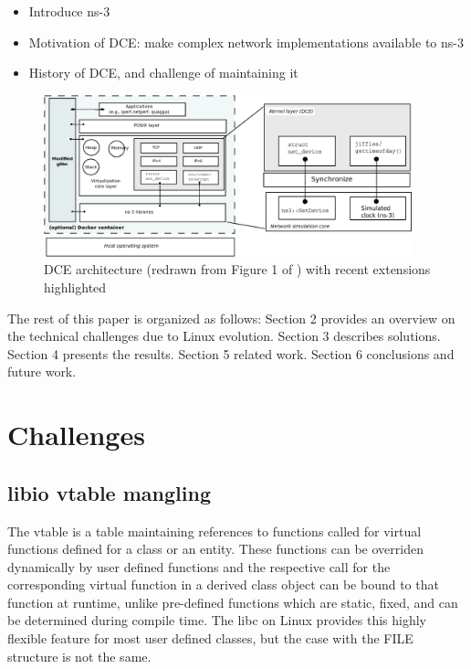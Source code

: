 \documentclass{sig-alternate}
\begin{document}
\begin{itemize}
\item Introduce ns-3
\item Motivation of DCE: make complex network implementations available to ns-3
\item History of DCE, and challenge of maintaining it
\end{itemize}

\begin{figure}[h!]
  \centering
    \includegraphics[width=0.95\textwidth]{figs/architecture.png}

  \caption{DCE architecture (redrawn from Figure 1 of \cite{Tazaki13}) with recent extensions highlighted}
  \label{fig:architecture}
\end{figure}

The rest of this paper is organized as follows: Section 2 provides an overview on the technical challenges due to Linux evolution.
Section 3 describes solutions.
Section 4 presents the results.  Section 5 related work.  Section 6 conclusions
and future work.

\section{Challenges}

\subsection{libio vtable mangling}
The vtable is a table maintaining references to functions called for virtual functions defined for a class or an entity. These functions can 
be overriden dynamically by user defined functions and the respective call for the corresponding virtual function in a derived class object can be bound 
to that function at runtime, unlike pre-defined functions which are static, fixed, and can be determined during compile time. The libc on Linux provides
this highly flexible feature for most user defined classes, but the case with the FILE structure is not the same.
\end{document}

